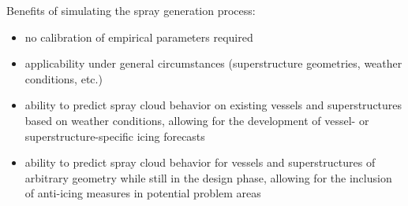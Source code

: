 \begin{frame}{\thesec}{}
  \vspace*{-2\baselineskip}
  \begin{block}{Benefits of simulating the spray generation process:}
    \begin{itemize}
      \item{
        no calibration of empirical parameters required
      }
      \item{
        applicability under general circumstances (superstructure geometries, weather conditions, etc.)
      }
	  \item{
	    ability to predict spray cloud behavior on existing vessels and superstructures based on weather conditions, allowing for the development of vessel- or superstructure-specific icing forecasts
	  }
	  \item{
	    ability to predict spray cloud behavior for vessels and superstructures of arbitrary geometry while still in the design phase, allowing for the inclusion of anti-icing measures in potential problem areas
	  }
    \end{itemize}
  \end{block}
\end{frame}
